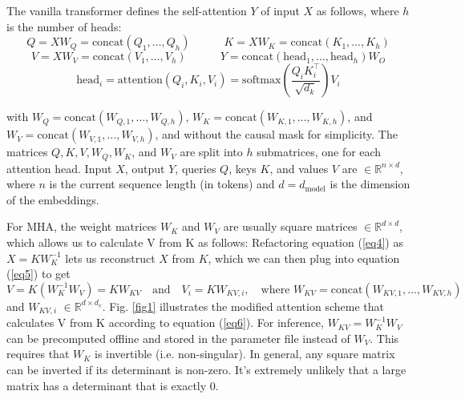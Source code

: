 \documentclass{article}
\newcommand{\eR}[2]{$\in \mathbb{R}^{#1 \times #2}$} %
\begin{document}
The vanilla transformer \citep{vanilla} defines the self-attention $Y$ of input $X$ as follows, where $h$ is the number of heads:
\begin{equation}
  Q = X W_Q = \text{concat} \left( Q_1, \ldots, Q_h \right) \qquad \quad K = X W_K = \text{concat} \left( K_1, \ldots, K_h \right) \label{eq4}
\end{equation}
\begin{equation}
  V = X W_V = \text{concat} \left( V_1, \ldots, V_h \right) \qquad \quad Y = \text{concat} \left( \text{head}_1, \ldots, \text{head}_h \right) W_O  \label{eq5}
\end{equation}
\begin{equation}
  \text{head}_i = \text{attention} \left( Q_i, K_i, V_i \right) = \text{softmax} \left( \frac{Q_i K_i^\top}{\sqrt{d_k}} \right) V_i \label{eq2}
\end{equation}

with $W_Q = \text{concat}(W_{Q,1}, \ldots, W_{Q,h})$, $W_K = \text{concat}(W_{K,1}, \ldots, W_{K,h})$, and $W_V = \text{concat}(W_{V,1}, \ldots, W_{V,h})$, and without the causal mask for simplicity. The matrices $Q, K, V, W_Q, W_K$, and $W_V$ are split into $h$ submatrices, one for each attention head. Input $X$, output $Y$, queries $Q$, keys $K$, and values $V$ are \eR{n}{d}, where $n$ is the current sequence length (in tokens) and $d = d_{\text{model}}$ is the dimension of the embeddings.

For MHA, the weight matrices $W_K$ and $W_V$ are usually square matrices \eR{d}{d}, which allows us to calculate V from K as follows: Refactoring equation (\ref{eq4}) as $X = K W_K^{-1}$ lets us reconstruct $X$ from $K$, which we can then plug into equation (\ref{eq5}) to get
\begin{equation}
  V = K (W_K^{-1} W_V) = K W_{KV} \quad \text{and} \quad V_i = K W_{KV,i}, \quad \text{where } W_{KV} = \text{concat}(W_{KV,1}, \ldots, W_{KV,h})
\label{eq6} \end{equation}
and $W_{KV,i}$ \eR{d}{d_v}. Fig. \ref{fig1} illustrates the modified attention scheme that calculates V from K according to equation (\ref{eq6}). For inference, $W_{KV} = W_K^{-1} W_V$ can be precomputed offline and stored in the parameter file instead of $W_V$. This requires that $W_K$ is invertible (i.e. non-singular). In general, any square matrix can be inverted if its determinant is non-zero. It’s extremely unlikely that a large matrix has a determinant that is exactly 0.
\end{document}
